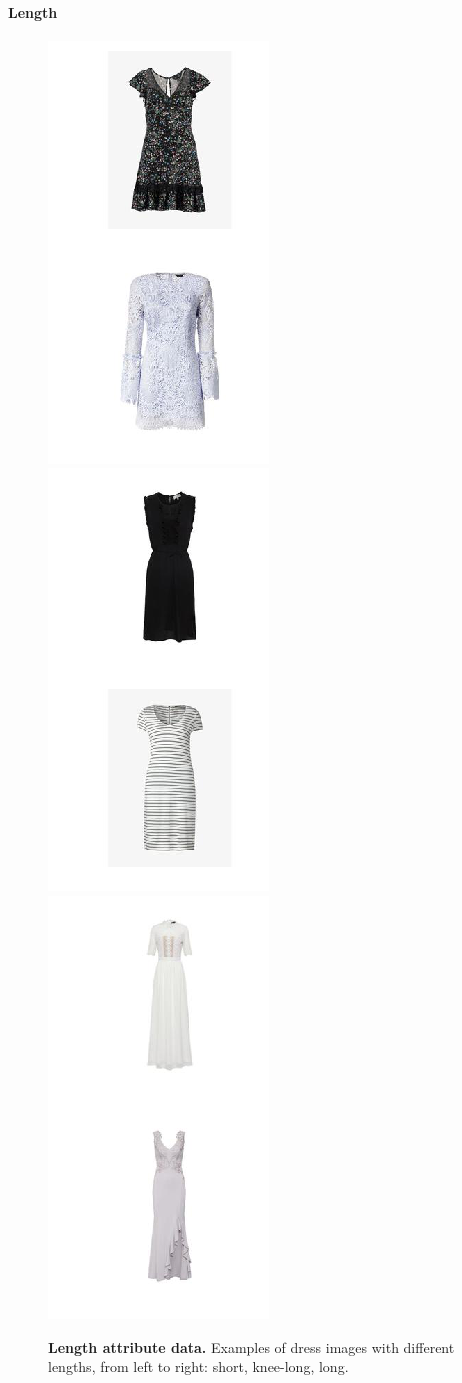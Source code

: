\documentclass[12pt]{report}
\begin{document}
\pagebreak
\paragraph{Length}

\begin{figure}[h]
\centering
{\includegraphics[width=.23\linewidth]{03_analysis/data/length_short}}
{\includegraphics[width=.23\linewidth]{03_analysis/data/length_knee}}
{\includegraphics[width=.23\linewidth]{03_analysis/data/length_long}}
\caption{\label{fig:length_data} \textbf{Length attribute data.} Examples of dress images with different lengths, from left to right: short, knee-long, long.}
\end{figure}





\pagebreak
\end{document}
